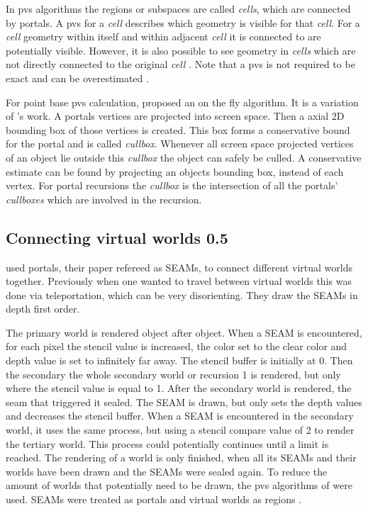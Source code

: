 In \gls{pvs} algorithms the regions or subspaces are called \textit{cells}, which are connected by portals. A \gls{pvs} for a \textit{cell} describes which geometry is visible for that \textit{cell}. For a \textit{cell} geometry within itself and within adjacent \textit{cell} it is connected to are potentially visible. However, it is also possible to see geometry in \textit{cells} which are not directly connected to the original \textit{cell} . Note that a \gls{pvs} is not required to be exact and can be overestimated \cite{cohen:2003:survey}.

For point base \gls{pvs} calculation, \textcite{luebke:1995:portals} proposed an on the fly algorithm. It is  a variation of \textcite{jones:1971:new}'s work. A portals vertices are projected into screen space. Then a axial 2D bounding box of those vertices is created. This box forms a conservative bound for the portal and is called  \textit{cullbox}. Whenever all screen space projected vertices of an object lie outside this \textit{cullbox} the object can safely be culled. A conservative estimate can be found by projecting an objects bounding box, instead of each vertex. For portal recursions the \textit{cullbox} is the intersection of all the portals' \textit{cullboxes} which are involved in the recursion. 



\subsection{Connecting virtual worlds 0.5}

\textcite{schmalstieg:1999:sewing} used portals, their paper refereed as SEAMs, to connect different virtual worlds together. Previously when one wanted to travel between virtual worlds this was done via teleportation, which can be very disorienting. They draw the SEAMs in depth first order.

The primary world is rendered object after object. When a SEAM is encountered, for each pixel  the stencil value is increased, the color set to the clear color and  depth value is set to infinitely far away. The stencil buffer is initially at 0. Then the secondary the whole secondary world or recursion 1 is rendered, but only where the stencil value is equal to 1. After the secondary world is rendered, the seam that triggered it sealed. The SEAM is drawn, but only sets the depth values and decreases the stencil buffer. When a SEAM is encountered in the secondary world, it uses the same process, but using a stencil compare value of 2 to render the tertiary world. This process could potentially continues until a limit is reached. The rendering of a world is only finished, when all its SEAMs and their worlds have been drawn and the SEAMs were sealed again. To reduce the amount of worlds that potentially need to be drawn,  the \gls{pvs} algorithms of \textcite{luebke:1995:portals} were used. SEAMs were treated as portals and virtual worlds as regions \cite{schmalstieg:1999:sewing}.

